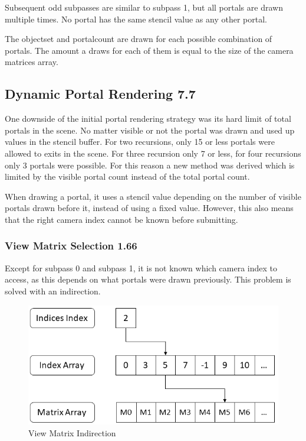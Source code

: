Subsequent odd subpasses are similar to subpass 1, but all portals are drawn multiple times. No portal has the same stencil value as any other portal.

The \gls{objectset} and \gls{portalcount} are drawn for each possible combination of portals. The amount a draws for each of them is equal to the size of the camera matrices array.


\subsection{Dynamic Portal Rendering 7.7}
One downside of the initial portal rendering strategy was its hard limit of total portals in the scene. No matter visible or not the portal was drawn and used up values in the stencil buffer. For two recursions, only 15 or less portals were allowed to exits in the scene. For three recursion only 7 or less, for four recursions only 3 portals were possible. For this reason a new method was derived which is limited by the visible portal count instead of the total portal count. 

When drawing a portal, it uses a stencil value depending on the number of visible portals drawn before it, instead of using a fixed value. However, this also means that the right camera index cannot be known before submitting.


\subsubsection{View Matrix Selection 1.66}
\label{section:viewmatrixselection}
Except for subpass 0 and subpass 1, it is not known which camera index to access, as this depends on what portals were drawn previously. This problem is solved with an indirection.

\begin{figure}[h]
	\includegraphics[width=\linewidth]{images/viewmatrixindirection.png}
	\caption{View Matrix Indirection}
	\label{fig:viewmatrixindirection}
\end{figure}

